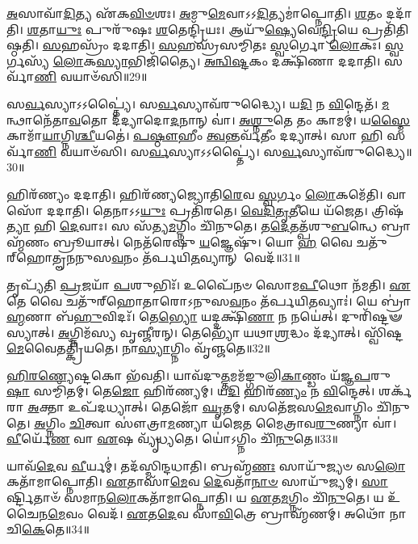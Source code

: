    \ul{𑌅}\-𑌸𑌾𑌵𑌾᳴\-\ul{𑌦𑌿}\-𑌤𑍍𑌯 𑌏᳴𑌕\-\ul{𑌵𑌿}\-\-\ul{𑍞}\-𑌶𑌃।
   \ul{𑌅}\-𑌮𑍁\-\ul{𑌮𑍇}\-𑌵𑌾𑌽𑌽\-\ul{𑌦𑌿}\-𑌤𑍍𑌯𑌮𑌾॑𑌪𑍍𑌨𑍋𑌤𑌿।
   \ul{𑌶}\-𑌤𑌂 𑌦𑌦𑌾᳴𑌤𑌿।
   \ul{𑌶}\-𑌤𑌾\-\ul{𑌯𑍁𑌃} 𑌪𑍁𑌰𑍁᳴𑌷𑌃 \ul{𑌶}\-𑌤𑍇𑌨𑍍𑌦𑍍𑌰𑌿᳴𑌯𑌃।
   𑌆𑌯𑍁᳴\-\ul{𑌷𑍍𑌯𑍇}\-𑌵𑍇\-\ul{𑌨𑍍𑌦𑍍𑌰𑌿}\-𑌯𑍇 𑌪𑍍𑌰𑌤𑌿᳴𑌤𑌿𑌷𑍍𑌠𑌤𑌿।
   \ul{𑌸}\-𑌹𑌸𑍍𑌰𑌂᳴ 𑌦𑌦𑌾𑌤𑌿।
   \ul{𑌸}\-𑌹𑌸𑍍𑌰᳴𑌸𑌮𑍍𑌮𑌿𑌤𑌃 \ul{𑌸𑍍𑌵}\-𑌰𑍍𑌗𑍋 \ul{𑌲𑍋}\-𑌕𑌃।
   \ul{𑌸𑍍𑌵}\-𑌰𑍍𑌗𑌸𑍍𑌯᳴ \ul{𑌲𑍋}\-𑌕\-\ul{𑌸𑍍𑌯𑌾}\-\-𑌭𑌿\-𑌜𑌿᳴𑌤𑍍𑌯𑍈।
   \ul{𑌅}\-\-\ul{𑌨𑍍𑌵𑌿}\-\-\ul{𑌷𑍍𑌟}\-𑌕𑌂 𑌦𑌕𑍍𑌷𑌿᳴𑌣𑌾 𑌦𑌦𑌾𑌤𑌿।
   𑌸𑌰𑍍𑌵𑌾᳴\-\ul{𑌣𑌿} 𑌵𑌯𑌾𑍞᳴𑌸𑌿॥29॥

   𑌸\-\ul{𑌰𑍍𑌵}\-𑌸𑍍𑌯𑌾𑌽𑌽𑌪𑍍𑌤𑍍𑌯𑍈॑।
   𑌸\-\ul{𑌰𑍍𑌵}\-𑌸𑍍𑌯𑌾𑌵᳴𑌰𑍁𑌦𑍍𑌧𑍍𑌯𑍈।
   𑌯\-\ul{𑌦𑌿} 𑌨 \ul{𑌵𑌿}\-𑌨𑍍𑌦𑍇𑌤᳴।
   \ul{𑌮}\-𑌨𑍍𑌥𑌾𑌨𑍇᳴𑌤𑌾\-\ul{𑌵}\-𑌤𑍋 𑌦᳴𑌦𑍍𑌯𑌾𑌦𑍋\-\ul{𑌦}\-𑌨𑌾𑌨𑍍 𑌵𑌾॑॑।
   \ul{𑌅}\-\-\ul{𑌶𑍍𑌨𑍁}\-𑌤𑍇 𑌤𑌂 𑌕𑌾𑌮𑌮𑍍॑।
   𑌯\-\ul{𑌸𑍍𑌮𑍈} 𑌕𑌾𑌮𑌾᳴\-\ul{𑌯𑌾}\-𑌗𑍍𑌨𑌿\-\ul{𑌶𑍍𑌚𑍀}\-𑌯𑌤𑍇॑।
   \ul{𑌪}\-\-\ul{𑌷𑍍𑌠𑍗}\-𑌹𑍀𑌂 \ul{𑌤𑍍𑌵}\-𑌨𑍍𑌤𑌰𑍍𑌵᳴𑌤𑍀𑌂 𑌦𑌦𑍍𑌯𑌾𑌤𑍍।
   𑌸𑌾 𑌹𑌿 𑌸𑌰𑍍𑌵𑌾᳴\-\ul{𑌣𑌿} 𑌵𑌯𑌾𑍞᳴𑌸𑌿।
   𑌸\-\ul{𑌰𑍍𑌵}\-𑌸𑍍𑌯𑌾𑌽𑌽𑌪𑍍𑌤𑍍𑌯𑍈॑।
   𑌸\-\ul{𑌰𑍍𑌵}\-𑌸𑍍𑌯𑌾𑌵᳴𑌰𑍁𑌦𑍍𑌧𑍍𑌯𑍈॥30॥

   𑌹𑌿𑌰᳴𑌣𑍍𑌯𑌂 𑌦𑌦𑌾𑌤𑌿।
   𑌹𑌿𑌰᳴𑌣𑍍𑌯𑌜𑍍𑌯𑍋𑌤𑌿\-\ul{𑌰𑍇}\-𑌵 \ul{𑌸𑍍𑌵}\-𑌰𑍍𑌗𑌂 \ul{𑌲𑍋}\-𑌕𑌮𑍇᳴𑌤𑌿।
   𑌵𑌾𑌸𑍋᳴ 𑌦𑌦𑌾𑌤𑌿।
   𑌤𑍇𑌨𑌾𑌽𑌽\-\ul{𑌯𑍁𑌃} 𑌪𑍍𑌰𑌤𑌿᳴𑌰𑌤𑍇।
   \ul{𑌵𑍇}\-\-\ul{𑌦𑌿}\-\-\ul{𑌤𑍃}\-\-\ul{𑌤𑍀}\-𑌯𑍇 𑌯᳴𑌜𑍇𑌤।
   𑌤𑍍𑌰𑌿𑌷᳴\-\ul{𑌤𑍍𑌯𑌾} 𑌹𑌿 \ul{𑌦𑍇}\-𑌵𑌾𑌃।
   𑌸 𑌸᳴𑌤𑍍𑌯\-\ul{𑌮}\-𑌗𑍍𑌨𑌿𑌂 𑌚𑌿᳴𑌨𑍁𑌤𑍇।
   𑌤\-\ul{𑌦𑍇}\-𑌤𑌤𑍍𑌪᳴𑌶𑍁\-\ul{𑌬}\-𑌨𑍍𑌧𑍇 𑌬𑍍𑌰𑌾𑌹𑍍𑌮᳴𑌣𑌂 𑌬𑍍𑌰𑍂𑌯𑌾𑌤𑍍।
   𑌨𑍇𑌤᳴𑌰𑍇𑌷𑍁 \ul{𑌯}\-𑌜𑍍𑌞𑍇𑌷𑍁᳴।
   𑌯𑍋 \ul{𑌹} 𑌵𑍈 𑌚𑌤𑍁᳴𑌰𑍍‌𑌹𑍋𑌤𑍄𑌨𑌨𑍁𑌸\-\ul{𑌵}\-𑌨𑌂 𑌤᳴𑌰𑍍𑌪𑌯𑌿\-\ul{𑌤}\-𑌵𑍍𑌯𑌾𑌨𑍍 𑌵𑍇𑌦᳴॥31॥

   𑌤𑍃𑌪𑍍𑌯᳴𑌤𑌿 \ul{𑌪𑍍𑌰}\-𑌜𑌯𑌾᳴ \ul{𑌪}\-𑌶𑍁𑌭𑌿𑌃᳴।
   𑌉𑌪𑍈᳴𑌨𑍞 𑌸𑍋𑌮\-\ul{𑌪𑍀}\-𑌥𑍋 𑌨᳴𑌮𑌤𑌿।
   \ul{𑌏}\-𑌤𑍇 𑌵𑍈 𑌚𑌤𑍁᳴𑌰𑍍‌𑌹𑍋𑌤𑌾𑌰𑍋𑌽𑌨𑍁𑌸\-\ul{𑌵}\-𑌨𑌂 𑌤᳴𑌰𑍍𑌪𑌯𑌿\-\ul{𑌤}\-𑌵𑍍𑌯𑌾𑌃॑।
   𑌯𑍇 𑌬𑍍𑌰𑌾॑\-\ul{𑌹𑍍𑌮}\-𑌣𑌾 𑌬᳴\-\ul{𑌹𑍁}\-𑌵𑌿𑌦𑌃᳴।
   𑌤𑍇\-\ul{𑌭𑍍𑌯𑍋} 𑌯𑌦𑍍𑌦𑌕𑍍𑌷𑌿᳴\-\ul{𑌣𑌾} 𑌨 𑌨𑌯𑍇॑𑌤𑍍।
   𑌦𑍁𑌰𑌿᳴𑌷𑍍𑌟𑍟 𑌸𑍍𑌯𑌾𑌤𑍍।
   \ul{𑌅}\-𑌗𑍍𑌨𑌿𑌮᳴𑌸𑍍𑌯 𑌵𑍃𑌞𑍍𑌜𑍀𑌰𑌨𑍍।
   𑌤𑍇𑌭𑍍𑌯𑍋᳴ 𑌯𑌥𑌾\-\ul{𑌶𑍍𑌰}\-𑌦𑍍𑌧𑌂 𑌦᳴𑌦𑍍𑌯𑌾𑌤𑍍।
   𑌸𑍍𑌵𑌿᳴𑌷𑍍𑌟\-\ul{𑌮𑍇}\-𑌵𑍈𑌤𑌤𑍍𑌕𑍍𑌰𑌿᳴𑌯𑌤𑍇।
   𑌨𑌾\-\ul{𑌸𑍍𑌯𑌾}\-𑌗𑍍𑌨𑌿𑌂 𑌵𑍃᳴𑌞𑍍𑌜𑌤𑍇॥32॥

   \ul{𑌹𑌿}\-\-\ul{𑌰}\-\-\ul{𑌣𑍍𑌯𑍇}\-𑌷𑍍𑌟𑌕𑍋 𑌭᳴𑌵𑌤𑌿।
   𑌯𑌾𑌵᳴𑌦𑍁\-\ul{𑌤𑍍𑌤}\-𑌮𑌮᳴𑌙𑍍𑌗𑍁𑌲𑌿\-\ul{𑌕𑌾}\-𑌣𑍍𑌡𑌂 𑌯᳴𑌜𑍍𑌞\-\ul{𑌪}\-𑌰𑍁\-\ul{𑌷𑌾} 𑌸𑌮𑍍𑌮𑌿᳴𑌤𑌮𑍍।
   𑌤𑍇\-\ul{𑌜𑍋} 𑌹𑌿𑌰᳴𑌣𑍍𑌯𑌮𑍍।
   𑌯\-\ul{𑌦𑌿} 𑌹𑌿𑌰᳴\-\ul{𑌣𑍍𑌯𑌂} 𑌨 \ul{𑌵𑌿}\-𑌨𑍍𑌦𑍇𑌤𑍍।
   𑌶𑌰𑍍𑌕᳴𑌰𑌾 \ul{𑌅}\-𑌕𑍍𑌤𑌾 𑌉𑌪᳴𑌦𑌧𑍍𑌯𑌾𑌤𑍍।
   𑌤𑍇𑌜𑍋᳴ \ul{𑌘𑍃}\-𑌤𑌮𑍍।
   𑌸𑌤𑍇᳴𑌜𑌸\-\ul{𑌮𑍇}\-𑌵𑌾𑌗𑍍𑌨𑌿𑌂 𑌚𑌿᳴𑌨𑍁𑌤𑍇।
   \ul{𑌅}\-𑌗𑍍𑌨𑌿𑌂 \ul{𑌚𑌿}\-𑌤𑍍𑌵𑌾 𑌸𑍗॑𑌤𑍍𑌰𑌾\-\ul{𑌮}\-𑌣𑍍𑌯𑌾 𑌯᳴𑌜𑍇𑌤 𑌮𑍈𑌤𑍍𑌰𑌾𑌵\-\ul{𑌰𑍁}\-𑌣𑍍𑌯𑌾 𑌵𑌾॑।
   \ul{𑌵𑍀}\-𑌰𑍍𑌯𑍇᳴\-\ul{𑌣} 𑌵𑌾 \ul{𑌏}\-𑌷 𑌵𑍍𑌯𑍃᳴𑌧𑍍𑌯𑌤𑍇।
   𑌯𑍋॑𑌽𑌗𑍍𑌨𑌿𑌂 𑌚𑌿᳴\-\ul{𑌨𑍁}\-𑌤𑍇॥33॥

   𑌯𑌾𑌵᳴\-\ul{𑌦𑍇}\-𑌵 \ul{𑌵𑍀}\-𑌰𑍍𑌯𑌮𑍍॑।
   𑌤𑌦᳴𑌸𑍍𑌮𑌿𑌨𑍍𑌦𑌧𑌾𑌤𑌿।
   𑌬𑍍𑌰𑌹𑍍𑌮᳴\-\ul{𑌣𑌃} 𑌸𑌾𑌯𑍁᳴𑌜𑍍𑌯𑍞 𑌸\-\ul{𑌲𑍋}\-𑌕𑌤𑌾᳴𑌮𑌾𑌪𑍍𑌨𑍋𑌤𑌿।
   \ul{𑌏}\-𑌤𑌾𑌸𑌾᳴\-\ul{𑌮𑍇}\-𑌵 \ul{𑌦𑍇}\-𑌵𑌤𑌾᳴\-\ul{𑌨𑌾}\-\-\ul{𑍞} 𑌸𑌾𑌯𑍁᳴𑌜𑍍𑌯𑌮𑍍।
   \ul{𑌸𑌾}\-𑌰𑍍𑌷𑍍𑌟𑌿𑌤𑌾𑍞᳴ 𑌸𑌮𑌾𑌨\-\ul{𑌲𑍋}\-𑌕𑌤𑌾᳴𑌮𑌾𑌪𑍍𑌨𑍋𑌤𑌿।
   𑌯 \ul{𑌏}\-𑌤\-\ul{𑌮}\-𑌗𑍍𑌨𑌿𑌂 𑌚𑌿᳴\-\ul{𑌨𑍁}\-𑌤𑍇।
   𑌯 𑌉᳴ 𑌚𑍈𑌨\-\ul{𑌮𑍇}\-𑌵𑌂 𑌵𑍇𑌦᳴।
   \ul{𑌏}\-𑌤\-\ul{𑌦𑍇}\-𑌵 𑌸𑌾᳴\-\ul{𑌵𑌿}\-𑌤𑍍𑌰𑍇 𑌬𑍍𑌰𑌾𑌹𑍍𑌮᳴𑌣𑌮𑍍।
   𑌅𑌥𑍋᳴ 𑌨𑌾𑌚𑌿\-\ul{𑌕𑍇}\-𑌤𑍇॥34॥
   \anuvakamend
  
